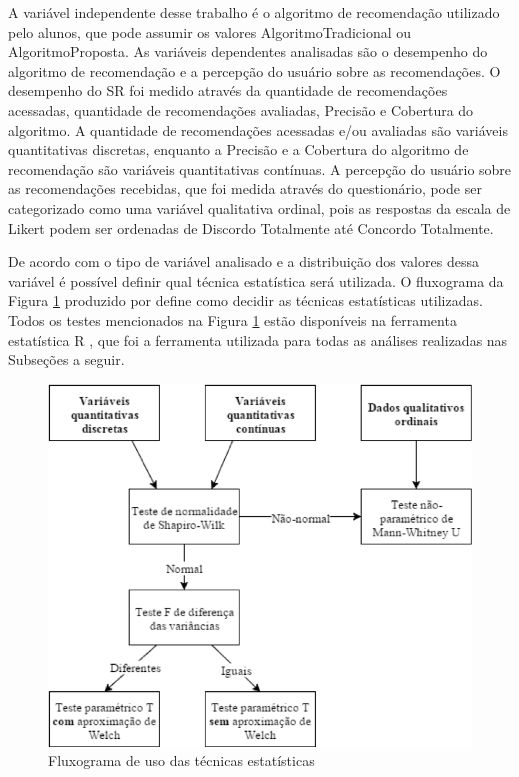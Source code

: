 A variável independente desse trabalho é o algoritmo de recomendação utilizado pelo alunos, que pode assumir os valores
AlgoritmoTradicional ou AlgoritmoProposta. As variáveis dependentes analisadas são o
desempenho do algoritmo de recomendação e a percepção do usuário sobre as recomendações. O desempenho do SR
foi medido através da quantidade de recomendações acessadas, quantidade de recomendações avaliadas, Precisão e Cobertura do
algoritmo. A quantidade de recomendações acessadas e/ou avaliadas são variáveis quantitativas discretas,
enquanto a Precisão e a Cobertura do algoritmo de recomendação são variáveis quantitativas contínuas. A percepção do usuário sobre
as recomendações recebidas, que foi medida através do questionário, pode ser categorizado como uma variável
qualitativa ordinal, pois as respostas da escala de Likert podem ser ordenadas de Discordo Totalmente até Concordo Totalmente.

De acordo com o tipo de variável analisado e a distribuição dos valores dessa variável é possível definir qual técnica
estatística será utilizada. O fluxograma da Figura \ref{fig:fluxograma-tecnica-moissa} produzido por 
define como decidir as técnicas estatísticas utilizadas. Todos os testes mencionados na Figura \ref{fig:fluxograma-tecnica-moissa}
estão disponíveis na ferramenta estatística R \cite{rstatisticalcomputing2018}, que foi a ferramenta utilizada para todas as análises realizadas nas
Subseções a seguir.

\begin{figure}[htb]
  \caption{\label{fig:fluxograma-tecnica-moissa}Fluxograma de uso das técnicas estatísticas}
  \begin{center}
      \includegraphics[scale=1.0]{./Figuras/fluxograma-tecnicas-moissa.png}
  \end{center}
\end{figure}

